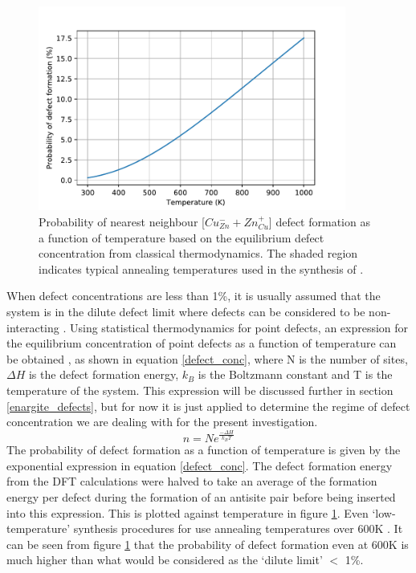 \documentclass[11pt, twoside]{report}
\begin{document}
\begin{figure}[h!]
  \centering
    \includegraphics[width=0.9\textwidth]{figures/CZTS_Cu-Zn_defect_conc.pdf}
    \caption{Probability of nearest neighbour [$Cu_{Zn}^- + Zn_{Cu}^+$] defect formation as a function of temperature based on the equilibrium defect concentration from classical thermodynamics. The shaded region indicates typical annealing temperatures used in the synthesis of {\CZTS}.}
  \label{Cu-Zn_eqm_conc}
\end{figure}

When defect concentrations are less than 1\%, it is usually assumed that the system is in the dilute defect limit where defects can be considered to be non-interacting \cite{Stoneham_defect_lim}. Using statistical thermodynamics for point defects, an expression for the equilibrium concentration of point defects as a function of temperature can be obtained \cite{thermodynamics}, as shown in equation \ref{defect_conc}, where N is the number of sites, $\Delta H$ is the defect formation energy, $k_B$ is the Boltzmann constant and T is the temperature of the system. This expression will be discussed further in section \ref{enargite_defects}, but for now it is just applied to determine the regime of defect concentration we are dealing with for the present investigation.
\begin{equation} \label{defect_conc}
n = Ne^{\frac{-\Delta H}{k_BT}}
\end{equation}
The probability of defect formation as a function of temperature is given by the exponential expression in equation \ref{defect_conc}. The defect formation energy from the DFT calculations were halved to take an average of the formation energy per defect during the formation of an antisite pair before being inserted into this expression. This is plotted against temperature in figure \ref{Cu-Zn_eqm_conc}. 
Even `low-temperature' synthesis procedures for {\CZTS} use annealing temperatures over 600K \cite{low_T_CZTS}. It can be seen from figure \ref{Cu-Zn_eqm_conc} that the probability of defect formation even at 600K is much higher than what would be considered as the `dilute limit' $<$ 1\%.
\end{document}
